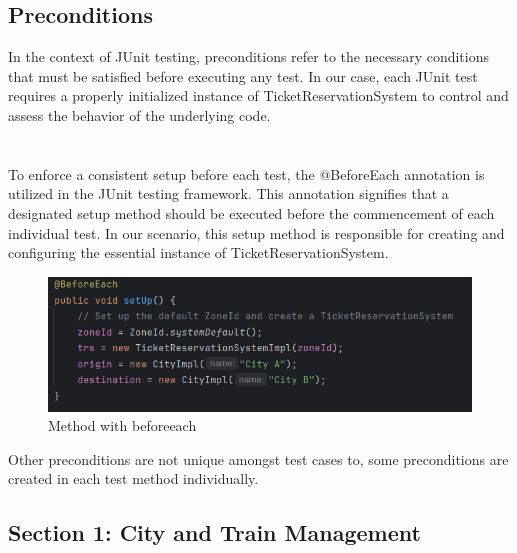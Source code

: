 \documentclass{article}
\begin{document}
 \subsection{Preconditions}
In the context of JUnit testing, preconditions refer to the necessary conditions that must be satisfied before executing any test. In our case, each JUnit test requires a properly initialized instance of TicketReservationSystem to control and assess the behavior of the underlying code. \\\\\\
To enforce a consistent setup before each test, the @BeforeEach annotation is utilized in the JUnit testing framework. This annotation signifies that a designated setup method should be executed before the commencement of each individual test. In our scenario, this setup method is responsible for creating and configuring the essential instance of TicketReservationSystem.
 \bigskip

\begin{figure}[h]
  \centering
  \includegraphics[width=1.0\textwidth]{pictures/T-B.png}
  \caption{Method with beforeeach}
  \label{fig:your_label}
\end{figure}

Other preconditions are not unique amongst test cases to, some preconditions are created in each test method individually. 

\pagebreak

\subsection{Section 1: City and Train Management}
\end{document}

